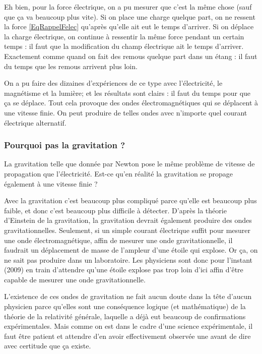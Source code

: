 Eh bien, pour la force électrique, on a pu mesurer que c'est la même chose (sauf que ça va beaucoup plus vite). Si on place une charge quelque part, on ne ressent la force \eqref{EqRappelFelec} qu'après qu'elle ait eut le temps d'arriver. Si on déplace la charge électrique, on continue à ressentir la même force pendant un certain temps : il faut que la modification du champ électrique ait le temps d'arriver. Exactement comme quand on fait des remous quelque part dans un étang : il faut du temps que les remous arrivent plus loin.

On a pu faire des dizaines d'expériences de ce type avec l'électricité, le magnétisme et la lumière; et les résultats sont clairs : il faut du temps pour que ça se déplace. Tout cela provoque des ondes électromagnétiques qui se déplacent à une vitesse finie. On peut produire de telles ondes avec n'importe quel courant électrique alternatif.

\subsubsection{Pourquoi pas la gravitation ?}

La gravitation telle que donnée par Newton pose le même problème de vitesse de propagation que l'électricité. Est-ce qu'en réalité la gravitation se propage également à une vitesse finie ?

Avec la gravitation c'est beaucoup plus compliqué parce qu'elle est beaucoup plus faible, et donc c'est beaucoup plus difficile à détecter. D'après la théorie d'Einstein de la gravitation, la gravitation devrait également produire des ondes gravitationnelles. Seulement, si un simple courant électrique suffit pour mesurer une onde électromagnétique, affin de mesurer une onde gravitationnelle, il faudrait un déplacement de masse de l'ampleur d'une étoile qui explose. Or ça, on ne sait pas produire dans un laboratoire. Les physiciens sont donc pour l'instant (2009) en train d'attendre qu'une étoile explose pas trop loin d'ici affin d'être capable de mesurer une onde gravitationnelle.

L'existence de ces ondes de gravitation ne fait aucun doute dans la tête d'aucun physicien parce qu'elles sont une conséquence logique (et mathématique) de la théorie de la relativité générale, laquelle a déjà eut beaucoup de confirmations expérimentales. Mais comme on est dans le cadre d'une science expérimentale, il faut être patient et attendre d'en avoir effectivement observée une avant de dire avec certitude que ça existe.

